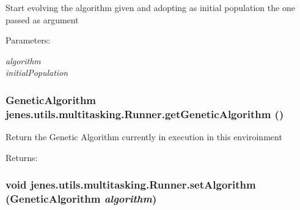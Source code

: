 Start evolving the algorithm given and adopting as initial population the one passed as argument \begin{Desc}
\item[Parameters:]
\begin{description}
\item[{\em algorithm}]\item[{\em initialPopulation}]\end{description}
\end{Desc}
\hypertarget{classjenes_1_1utils_1_1multitasking_1_1_runner_462a121a840bbf06593bbd7da219d8b9}{
\subsubsection[getGeneticAlgorithm]{\setlength{\rightskip}{0pt plus 5cm}GeneticAlgorithm jenes.utils.multitasking.Runner.getGeneticAlgorithm ()}}
\label{classjenes_1_1utils_1_1multitasking_1_1_runner_462a121a840bbf06593bbd7da219d8b9}


Return the Genetic Algorithm currently in execution in this enviroinment \begin{Desc}
\item[Returns:]\end{Desc}
\hypertarget{classjenes_1_1utils_1_1multitasking_1_1_runner_dad9fb400d736e55bcd3dfdf07742437}{
\subsubsection[setAlgorithm]{\setlength{\rightskip}{0pt plus 5cm}void jenes.utils.multitasking.Runner.setAlgorithm (GeneticAlgorithm {\em algorithm})}}
\label{classjenes_1_1utils_1_1multitasking_1_1_runner_dad9fb400d736e55bcd3dfdf07742437}



